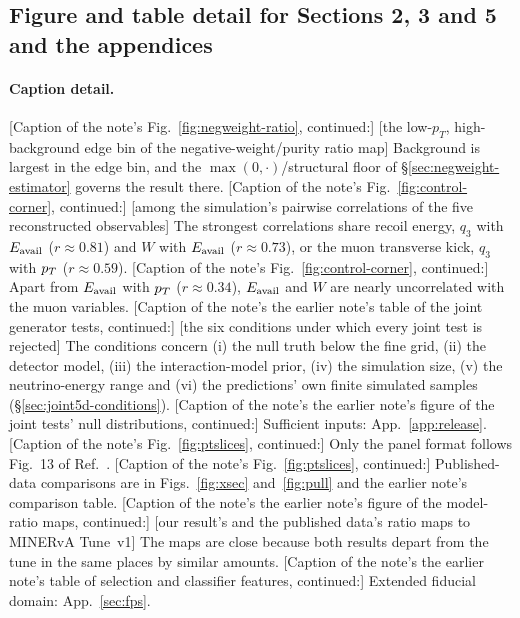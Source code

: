 \subsection{Figure and table detail for Sections 2, 3 and 5 and the appendices}\label{recsec:supplementary-captions}

\paragraph{Caption detail.} [Caption of the note's Fig.~\ref{fig:negweight-ratio}, continued:] [the low-$p_T$, high-background edge bin of the negative-weight/purity ratio map] Background is largest in the edge bin, and the $\max(0,\cdot)$/structural floor of \S\ref{sec:negweight-estimator} governs the result there. [Caption of the note's Fig.~\ref{fig:control-corner}, continued:] [among the simulation's pairwise correlations of the five reconstructed observables] The strongest correlations share recoil energy, $q_{3}$ with $E_{\mathrm{avail}}$ ($r\approx0.81$) and $W$ with $E_{\mathrm{avail}}$ ($r\approx0.73$), or the muon transverse kick, $q_{3}$ with $p_{T}$ ($r\approx0.59$). [Caption of the note's Fig.~\ref{fig:control-corner}, continued:] Apart from $E_{\mathrm{avail}}$ with $p_{T}$ ($r\approx0.34$), $E_{\mathrm{avail}}$ and $W$ are nearly uncorrelated with the muon variables. [Caption of the note's the earlier note's table of the joint generator tests, continued:] [the six conditions under which every joint test is rejected] The conditions concern (i) the null truth below the fine grid, (ii) the detector model, (iii) the interaction-model prior, (iv) the simulation size, (v) the neutrino-energy range and (vi) the predictions' own finite simulated samples (\S\ref{sec:joint5d-conditions}). [Caption of the note's the earlier note's figure of the joint tests' null distributions, continued:] Sufficient inputs: App.~\ref{app:release}. [Caption of the note's Fig.~\ref{fig:ptslices}, continued:] Only the panel format follows Fig.~13 of Ref.~\cite{MINERvA:2021owq}. [Caption of the note's Fig.~\ref{fig:ptslices}, continued:] Published-data comparisons are in Figs.~\ref{fig:xsec} and~\ref{fig:pull} and the earlier note's comparison table. [Caption of the note's the earlier note's figure of the model-ratio maps, continued:] [our result's and the published data's ratio maps to MINERvA Tune~v1] The maps are close because both results depart from the tune in the same places by similar amounts. [Caption of the note's the earlier note's table of selection and classifier features, continued:] Extended fiducial domain: App.~\ref{sec:fps}.
